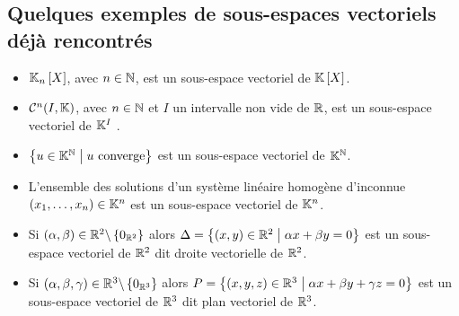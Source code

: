 \subsection{Quelques exemples de sous-espaces vectoriels déjà rencontrés}
\begin{defprop}
    \begin{itemize}
    \item \(\mathbb{K}_n \left[X\right]\), avec \(n \in  \mathbb{N}\), est un sous-espace vectoriel de \(\mathbb{K} \left[X\right]\).
    \item  \(\mathcal{C}^n (I, \mathbb{K})\), avec \(n \in  \mathbb{N}\) et \(I\) un intervalle non vide de \(\mathbb{R}\), est un sous-espace vectoriel de \(\mathbb{K}^I\) .
    \item  \(\left\lbrace u \in  \mathbb{K}^{\mathbb{N}} \;\middle|\; u \text{ converge}\right\rbrace\) est un sous-espace vectoriel de \(\mathbb{K}^{\mathbb{N}}\).
    \item  L’ensemble des solutions d’un système linéaire homogène d’inconnue \((x_1, \dots, x_n) \in  \mathbb{K}^n\) est un sous-espace vectoriel de \(\mathbb{K}^n\).
    \item  Si \((\alpha, \beta ) \in  \mathbb{R}^2 \backslash \left\lbrace0_{\mathbb{R}^2} \right\rbrace\) alors \(\Delta = \left\lbrace(x, y) \in  \mathbb{R}^2 \;\middle|\; \alpha x + \beta y = 0\right\rbrace\) est un sous-espace vectoriel de \(\mathbb{R}^2\) dit droite vectorielle de \(\mathbb{R}^2\).
    \item  Si \((\alpha, \beta , \gamma) \in  \mathbb{R}^3 \backslash \left\lbrace0_{\mathbb{R}^3}\right\rbrace\) alors \(P = \left\lbrace(x, y, z) \in  \mathbb{R}^3 \;\middle|\; \alpha x + \beta y + \gamma z = 0\right\rbrace\) est un sous-espace vectoriel de \(\mathbb{R}^3\) dit plan vectoriel de \(\mathbb{R}^3\).
    \end{itemize}
\end{defprop}

